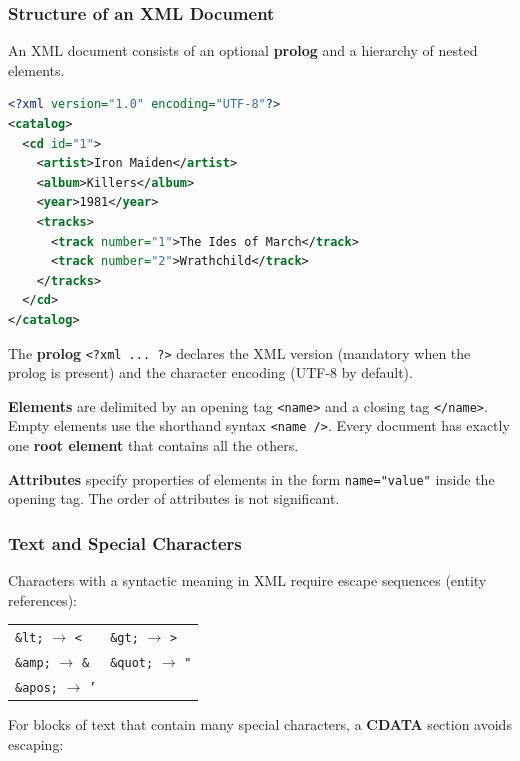 \subsubsection{Structure of an XML Document}
\label{subsec:xml-structure}

An XML document consists of an optional \textbf{prolog} and a hierarchy of nested elements.

\begin{lstlisting}[language=XML, basicstyle=\ttfamily\scriptsize]
<?xml version="1.0" encoding="UTF-8"?>
<catalog>
  <cd id="1">
    <artist>Iron Maiden</artist>
    <album>Killers</album>
    <year>1981</year>
    <tracks>
      <track number="1">The Ides of March</track>
      <track number="2">Wrathchild</track>
    </tracks>
  </cd>
</catalog>
\end{lstlisting}

The \textbf{prolog} \texttt{<?xml ... ?>} declares the XML version (mandatory when the prolog is present) and the character encoding (UTF-8 by default).

\textbf{Elements} are delimited by an opening tag \texttt{<name>} and a closing tag \texttt{</name>}. Empty elements use the shorthand syntax \texttt{<name />}. Every document has exactly one \textbf{root element} that contains all the others.

\textbf{Attributes} specify properties of elements in the form \texttt{name="value"} inside the opening tag. The order of attributes is not significant.

\subsubsection{Text and Special Characters}
\label{subsec:xml-special-chars}

Characters with a syntactic meaning in XML require escape sequences (entity references):

{\scriptsize
\begin{center}
\begin{tabular}{ll}
\texttt{\&lt;} $\rightarrow$ \texttt{<} & \texttt{\&gt;} $\rightarrow$ \texttt{>} \\
\texttt{\&amp;} $\rightarrow$ \texttt{\&} & \texttt{\&quot;} $\rightarrow$ \texttt{"} \\
\texttt{\&apos;} $\rightarrow$ \texttt{'} &
\end{tabular}
\end{center}
}

For blocks of text that contain many special characters, a \textbf{CDATA} section avoids escaping:

